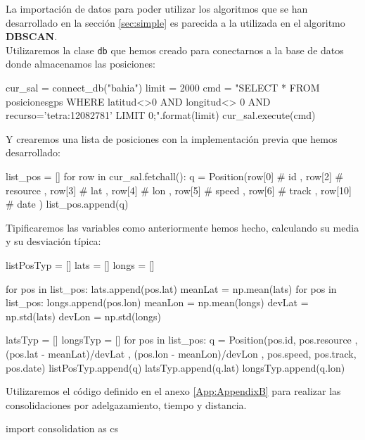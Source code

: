 \documentclass[a4paper, 12pt]{article}
\begin{document}
La importaci\'on de datos para poder utilizar los algoritmos que se han desarrollado en la secci\'on \ref{sec:simple} es parecida a la utilizada en el algoritmo \textbf{DBSCAN}.\\ 

Utilizaremos la clase \texttt{db} que hemos creado para conectarnos a la base de datos donde almacenamos las posiciones:\\

\begin{python}
cur_sal = connect_db("bahia")
limit = 2000
cmd = "SELECT * FROM posicionesgps WHERE latitud<>0 
			AND longitud<> 0 AND recurso='tetra:12082781' 
			LIMIT {0};".format(limit)
cur_sal.execute(cmd)
\end{python}

\bigskip
Y crearemos una lista de posiciones con la implementaci\'on previa que hemos desarrollado:\\

\begin{python}
list_pos = []
for row in cur_sal.fetchall():
	q = Position(row[0] # id
		, row[2] # resource
		, row[3] # lat
		, row[4] # lon
		, row[5] # speed
		, row[6] # track
		, row[10] # date
		)
	list_pos.append(q)
\end{python}

\smallskip
Tipificaremos las variables como anteriormente hemos hecho, calculando su media y su desviaci\'on t\'ipica:\\

\begin{python}
listPosTyp = []
lats = []
longs = []

for pos in list_pos:
    lats.append(pos.lat)
meanLat = np.mean(lats)
for pos in list_pos:
    longs.append(pos.lon)
meanLon = np.mean(longs)
devLat = np.std(lats)
devLon = np.std(longs)

latsTyp = []
longsTyp = []
for pos in list_pos:
	q = Position(pos.id, pos.resource
	, (pos.lat - meanLat)/devLat
	, (pos.lon - meanLon)/devLon
	, pos.speed, pos.track, pos.date)
	listPosTyp.append(q)
	latsTyp.append(q.lat)
	longsTyp.append(q.lon)
\end{python}

\bigskip
Utilizaremos el c\'odigo definido en el anexo \ref{App:AppendixB} para realizar las consolidaciones por adelgazamiento, tiempo y distancia.\\

\begin{python}
import consolidation as cs
\end{python}
\end{document}

